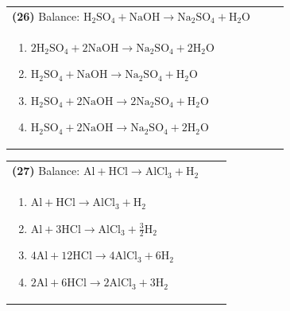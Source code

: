 \documentclass{article}
\begin{document}
\vspace{0.2cm}
\noindent \begin{tabular}{|p{0.9\linewidth}|}
\hline
\vspace{0.2cm}
\textbf{(26)} Balance: \(\mathrm{H_2SO_4 + NaOH \rightarrow Na_2SO_4 + H_2O}\)\\
\begin{minipage}[t]{0.85\linewidth}
\begin{enumerate}[label=\alph*.]
   \item \(\mathrm{2H_2SO_4 + 2NaOH \rightarrow Na_2SO_4 + 2H_2O}\)
   \item \(\mathrm{H_2SO_4 + NaOH \rightarrow Na_2SO_4 + H_2O}\)
   \item \(\mathrm{H_2SO_4 + 2NaOH \rightarrow 2Na_2SO_4 + H_2O}\)
   \item \(\mathrm{H_2SO_4 + 2NaOH \rightarrow Na_2SO_4 + 2H_2O}\)
\end{enumerate}
\end{minipage}\\
\hline
\end{tabular}

\vspace{0.2cm}
\noindent \begin{tabular}{|p{0.9\linewidth}|}
\hline
\vspace{0.2cm}
\textbf{(27)} Balance: \(\mathrm{Al + HCl \rightarrow AlCl_3 + H_2}\)\\
\begin{minipage}[t]{0.85\linewidth}
\begin{enumerate}[label=\alph*.]
   \item \(\mathrm{Al + HCl \rightarrow AlCl_3 + H_2}\)
   \item \(\mathrm{Al + 3HCl \rightarrow AlCl_3 + \tfrac{3}{2}H_2}\)
   \item \(\mathrm{4Al + 12HCl \rightarrow 4AlCl_3 + 6H_2}\)
   \item \(\mathrm{2Al + 6HCl \rightarrow 2AlCl_3 + 3H_2}\)
\end{enumerate}
\end{minipage}\\
\hline
\end{tabular}
\end{document}
